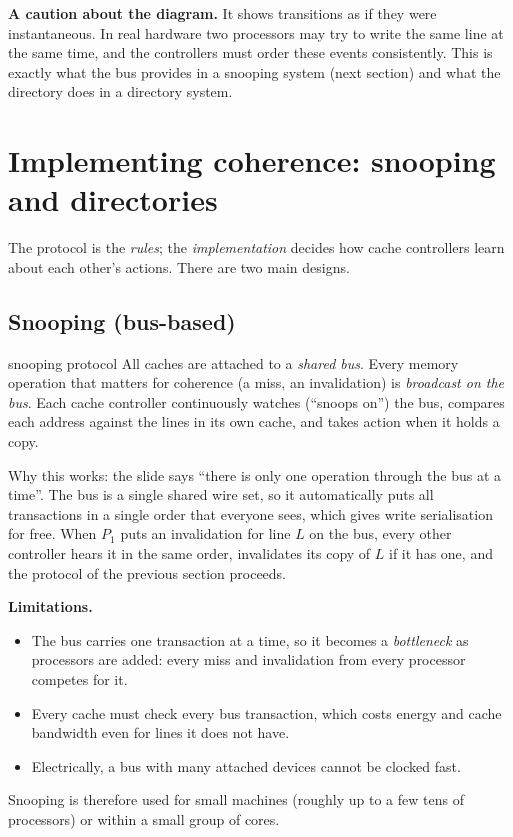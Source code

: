 \textbf{A caution about the diagram.} It shows transitions as if they were instantaneous. In real hardware two processors may try to write
the same line at the same time, and the controllers must order these events consistently. This is exactly what the bus provides in a snooping system (next
section) and what the directory does in a directory system.

\section{Implementing coherence: snooping and directories}

The protocol is the \emph{rules}; the \emph{implementation} decides how cache controllers learn about each other's actions.
There are two main designs.

\subsection{Snooping (bus-based)}

\begin{definition}{snooping protocol}
All caches are attached to a \emph{shared bus}. Every memory operation that matters for coherence
(a miss, an invalidation) is \emph{broadcast on the bus}. Each cache controller continuously watches (``snoops on'') the bus, compares each address against the lines in its own cache, and takes action when it
holds a copy.
\end{definition}

Why this works: the slide says ``there is only one operation through the bus at a time''. The bus is a single shared wire set, so it
automatically puts all transactions in a single order that everyone sees, which gives write serialisation for free. When $P_1$ puts an
invalidation for line $L$ on the bus, every other controller hears it in the same order, invalidates its copy of $L$ if it has one, and
the protocol of the previous section proceeds.

\textbf{Limitations.}
\begin{itemize}
  \item The bus carries one transaction at a time, so it becomes a \emph{bottleneck} as processors are added: every miss and
        invalidation from every processor competes for it.
  \item Every cache must check every bus transaction, which costs energy and cache bandwidth even for lines it does not have.
  \item Electrically, a bus with many attached devices cannot be clocked fast.
\end{itemize}
Snooping is therefore used for small machines (roughly up to a few tens of processors) or within a small group of cores.

